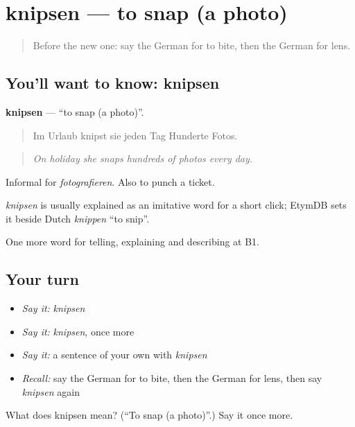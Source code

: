 \section[knipsen]{knipsen — to snap (a photo)}

\label{lesson:GE-C502-knipsen}



\begin{quote}
Before the new one: say the German for to bite, then the German for lens.
\end{quote}

\subsection*{You'll want to know: knipsen}
\textbf{knipsen} — \textquotedblleft{}to snap (a photo)\textquotedblright{}.

\begin{quote}
Im Urlaub knipst sie jeden Tag Hunderte Fotos.
\end{quote}

\begin{quote}
\emph{On holiday she snaps hundreds of photos every day.}
\end{quote}

Informal for \emph{fotografieren}. Also to punch a ticket.

\begin{cousinweb}
\emph{knipsen} is usually explained as an imitative word for a short click; EtymDB sets it beside Dutch \emph{knippen} \textquotedblleft{}to snip\textquotedblright{}.
\end{cousinweb}

\begin{grammarlens}[title={What you've built}]
One more word for telling, explaining and describing at B1.
\end{grammarlens}

\subsection*{Your turn}
\begin{itemize}
\raggedright
  \item \emph{Say it:} \emph{knipsen}
  \item \emph{Say it:} \emph{knipsen}, once more
  \item \emph{Say it:} a sentence of your own with \emph{knipsen}
  \item \emph{Recall:} say the German for to bite, then the German for lens, then say \emph{knipsen} again
\end{itemize}

\begin{tcolorbox}[breakable,colback=teal!4,colframe=teal!35!black,title={Before you move on}]
What does knipsen mean? (\textquotedblleft{}To snap (a photo)\textquotedblright{}.) Say it once more.
\end{tcolorbox}
